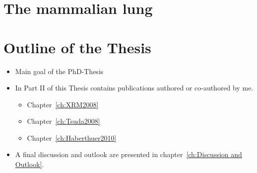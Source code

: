 \label{ch:Introduction}
\lipsum[1]

\section{The mammalian lung}
\lipsum[1]

\section{Outline of the Thesis}
\begin{itemize}
	\item Main goal of the PhD-Thesis
	\item In Part II of this Thesis contains publications authored or co-authored by me.
	\begin{itemize}
		\item Chapter~\ref{ch:XRM2008}
		\item Chapter~\ref{ch:Tsuda2008}
		\item Chapter~\ref{ch:Haberthuer2010}
	\end{itemize}
	\item A final discussion and outlook are presented in chapter~\ref{ch:Discussion and Outlook}.
\end{itemize}